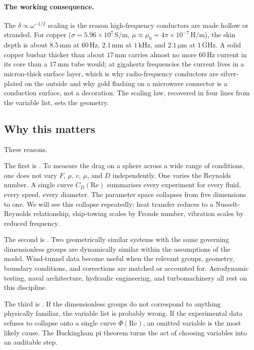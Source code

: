 \paragraph{The working consequence.} The $\delta \propto \omega^{-1/2}$
scaling is the reason high-frequency conductors are made hollow or
stranded. For copper ($\sigma = 5.96 \times 10^{7} \,\si{\siemens
\per\meter}$, $\mu \approx \mu_{0} = 4\pi \times 10^{-7} \,\si{\henry
\per\meter}$), the skin depth is about $8.5 \,\si{\milli\meter}$ at
$60 \,\si{\hertz}$, $2.1 \,\si{\milli\meter}$ at $1 \,\si{\kilo
\hertz}$, and $2.1 \,\si{\micro\meter}$ at $1 \,\si{\giga\hertz}$.
A solid copper busbar thicker than about $17 \,\si{\milli\meter}$
carries almost no more $60 \,\si{\hertz}$ current in its core than a
$17 \,\si{\milli\meter}$ tube would; at gigahertz frequencies the
current lives in a micron-thick surface layer, which is why
radio-frequency conductors are silver-plated on the outside and why
gold flashing on a microwave connector is a conduction surface, not a
decoration. The scaling law, recovered in four lines from the
variable list, sets the geometry.

\subsection{Why this matters}

Three reasons.

The first is . To measure the
drag on a sphere across a wide range of conditions, one does not vary
$F$, $\rho$, $v$, $\mu$, and $D$ independently. One varies the
Reynolds number. A single curve $C_{D}(\mathrm{Re})$ summarises every
experiment for every fluid, every speed, every diameter. The
parameter space collapses from five dimensions to one. We will see
this collapse repeatedly: heat transfer reduces to a Nusselt-Reynolds
relationship, ship-towing scales by Froude number, vibration scales
by reduced frequency.

The second is . Two geometrically
similar systems with the same governing dimensionless groups are
dynamically similar within the assumptions of the model. Wind-tunnel
data become useful when the relevant groups, geometry, boundary
conditions, and corrections are matched or accounted for. Aerodynamic
testing, naval architecture, hydraulic engineering, and
turbomachinery all rest on this discipline.

The third is . If the
dimensionless groups do not correspond to anything physically
familiar, the variable list is probably wrong. If the experimental
data refuses to collapse onto a single curve $\Phi(\mathrm{Re})$, an
omitted variable is the most likely cause. The Buckingham pi theorem
turns the act of choosing variables into an auditable step.

